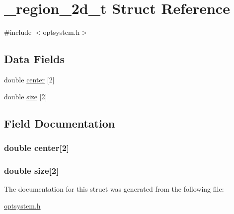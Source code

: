 \hypertarget{a00006}{\section{\-\_\-region\-\_\-2d\-\_\-t \-Struct \-Reference}
\label{de/d21/a00006}
}


{\ttfamily \#include $<$optsystem.\-h$>$}

\subsection*{\-Data \-Fields}
\begin{DoxyCompactItemize}
\item 
double \hyperlink{a00006_a00e863db26745564c8e171606f0900e2_a00e863db26745564c8e171606f0900e2}{center} \mbox{[}2\mbox{]}
\item 
double \hyperlink{a00006_ad1af25ff64d4bcccf1c67fb516a10b13_ad1af25ff64d4bcccf1c67fb516a10b13}{size} \mbox{[}2\mbox{]}
\end{DoxyCompactItemize}


\subsection{\-Field \-Documentation}
\hypertarget{a00006_a00e863db26745564c8e171606f0900e2_a00e863db26745564c8e171606f0900e2}{
\subsubsection[{center}]{\setlength{\rightskip}{0pt plus 5cm}double {\bf center}\mbox{[}2\mbox{]}}}\label{de/d21/a00006_a00e863db26745564c8e171606f0900e2_a00e863db26745564c8e171606f0900e2}
\hypertarget{a00006_ad1af25ff64d4bcccf1c67fb516a10b13_ad1af25ff64d4bcccf1c67fb516a10b13}{
\subsubsection[{size}]{\setlength{\rightskip}{0pt plus 5cm}double {\bf size}\mbox{[}2\mbox{]}}}\label{de/d21/a00006_ad1af25ff64d4bcccf1c67fb516a10b13_ad1af25ff64d4bcccf1c67fb516a10b13}


\-The documentation for this struct was generated from the following file\-:\begin{DoxyCompactItemize}
\item 
\hyperlink{a00018}{optsystem.\-h}\end{DoxyCompactItemize}
